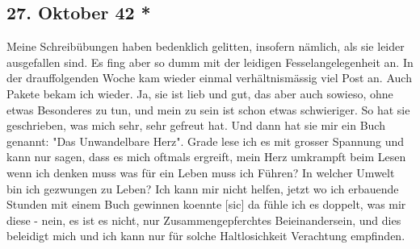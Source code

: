 \subsection{27. Oktober 42 *}

Meine Schreib\"{u}bungen haben bedenklich gelitten, insofern n\"{a}mlich, als sie leider ausgefallen sind.
Es fing aber so dumm mit der leidigen Fesselangelegenheit an.
In der drauffolgenden Woche kam wieder einmal verh\"{a}ltnism\"{a}ssig viel Post an.
Auch Pakete bekam ich wieder.
Ja, sie ist lieb und gut, das aber auch sowieso, ohne etwas Besonderes zu tun, und mein zu sein ist schon etwas schwieriger.
So hat sie geschrieben, was mich sehr, sehr gefreut hat.
Und dann hat sie mir ein Buch genannt: "Das Unwandelbare Herz".
Grade lese ich es mit grosser Spannung und kann nur sagen, dass es mich oftmals ergreift, mein Herz umkrampft beim Lesen wenn ich denken muss was f\"{u}r ein Leben muss ich F\"{u}hren?
In welcher Umwelt bin ich gezwungen zu Leben?
Ich kann mir nicht helfen, jetzt wo ich erbauende Stunden mit einem Buch gewinnen koennte{\color{red} [sic] } da f\"{u}hle ich es doppelt, was mir diese - nein, es ist es nicht, nur Zusammengepferchtes Beieinandersein, und dies beleidigt mich und ich kann nur f\"{u}r solche Haltlosichkeit Verachtung empfinden.

\clearpage
